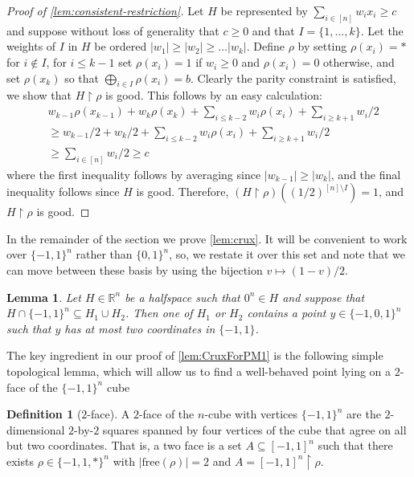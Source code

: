 \documentclass[11pt]{article}
\numberwithin{equation}{section}
\newtheorem{lemma}[theorem]{Lemma}
\theoremstyle{definition}
\newtheorem{definition}[theorem]{Definition}
\theoremstyle{plain}
\newcommand{\reals}{\ensuremath{\mathbb{R}}}
\newcommand{\set}[1]{\{ #1 \}}
\renewcommand{\restriction}{\!\!\upharpoonright}
\newcommand{\free}{\ensuremath{\mathrm{free}}}
\renewcommand{\restriction}{\!\ensuremath{\upharpoonright}\!}
\begin{document}
\begin{proof}[Proof of \autoref{lem:consistent-restriction}]
	Let $H$ be represented by $\sum_{i \in [n]} w_i x_i \geq c$ and suppose without loss of generality that $c \geq 0$ and that $I = \{1, \ldots, k\}$. 
	Let the weights of $I$ in $H$ be ordered $|w_1| \geq |w_2| \geq \ldots |w_k|$. 
	Define $\rho$ by setting $\rho(x_i) = *$ for $i \not \in I$, for $i \leq k-1$ set $\rho(x_i) = 1$ if $w_i \geq 0$ and $\rho(x_i) = 0$ otherwise, and set $\rho(x_k)$ so that $\bigoplus_{i \in I} \rho(x_i) = b$. 
	Clearly the parity constraint is satisfied, we show that $H \restriction \rho$ is good.
	This follows by an easy calculation:
	\begin{align*} 
		 &w_{k-1}\rho(x_{k-1}) + w_k\rho(x_k) + \sum_{i \leq k-2} w_i \rho(x_i) + \sum_{i \geq k+1} w_i/2 \\
			&\geq w_{k-1}/2 + w_k/2 + \sum_{i \leq k-2} w_i \rho(x_i) + \sum_{i \geq k+1} w_i/2 	\\
			&\geq \sum_{i \in [n]} w_i/2 \geq c 
	\end{align*}
	where the first inequality follows by averaging since $|w_{k-1}| \geq |w_{k}|$, and the final inequality follows since $H$ is good. Therefore, $(H \restriction \rho)((1/2)^{[n]\setminus I}) =1 $, and $H \restriction \rho$ is good.
\end{proof}


In the remainder of the section we prove \autoref{lem:crux}.
It will be convenient to work over $\{-1,1\}^n$ rather than $\{0,1\}^n$, so, we restate it over this set and note that we can move between these basis by using the bijection $v \mapsto (1-v)/2$.

\begin{lemma}\label{lem:CruxForPM1}
	Let $H \in \reals^n$ be a halfspace such that $0^n \in H$ and suppose that $H \cap \set{-1,1}^n \subseteq H_1 \cup H_2$. 
	Then one of $H_1$ or $H_2$ contains a point $y \in \{-1,0,1\}^n$ such that $y$ has at most two coordinates in $\{-1,1\}$. 
\end{lemma}

The key ingredient in our proof of \autoref{lem:CruxForPM1} is the following simple topological lemma, which will allow us to find a well-behaved point lying on a $2$-face of the $\{-1,1\}^n$ cube

\begin{definition}[$2$-face]
	A $2$-face of the $n$-cube with vertices $\{-1,1\}^n$ are the $2$-dimensional $2$-by-$2$ squares spanned by four vertices of the cube that agree on all but two coordinates. 
%
That is, a two face is a set $A \subseteq [-1,1]^n$ such that there exists $\rho \in \{-1,1,*\}^n$ with $|\free(\rho)| = 2$ and $A = [-1,1]^n \restriction \rho$.
\end{definition}
\end{document}
